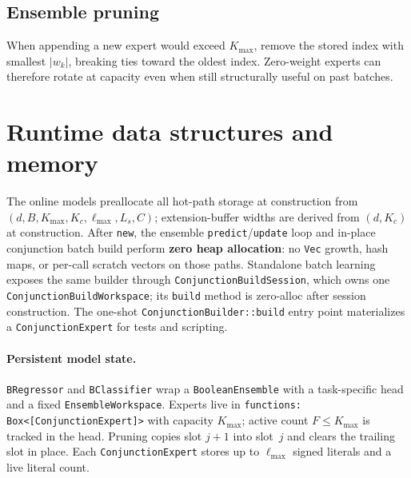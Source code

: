 \documentclass[11pt]{article}
\begin{document}
\subsection{Ensemble pruning}
When appending a new expert would exceed $K_{\max}$, remove the stored index
with smallest $|w_k|$, breaking ties toward the oldest index.  Zero-weight
experts can therefore rotate at capacity even when still structurally useful on
past batches.

\section{Runtime data structures and memory}
The online models preallocate all hot-path storage at construction from
$(d,B,K_{\max},K_c,\ell_{\max},L_s,C)$; extension-buffer widths are derived
from $(d,K_c)$ at construction.  After \texttt{new}, the ensemble
\texttt{predict}/\texttt{update} loop and in-place conjunction batch build perform
\textbf{zero heap allocation}: no \texttt{Vec} growth, hash maps, or per-call
scratch vectors on those paths.  Standalone batch learning exposes the same
builder through \texttt{ConjunctionBuildSession}, which owns one
\texttt{ConjunctionBuildWorkspace}; its \texttt{build} method is zero-alloc after session
construction.  The one-shot \texttt{ConjunctionBuilder::build} entry point materializes
a \texttt{ConjunctionExpert} for tests and scripting.

\paragraph{Persistent model state.}
\texttt{BRegressor} and \texttt{BClassifier} wrap a \texttt{BooleanEnsemble}
with a task-specific head and a fixed \texttt{EnsembleWorkspace}.  Experts
live in \texttt{functions: Box<[ConjunctionExpert]>} with capacity $K_{\max}$;
active count $F\leq K_{\max}$ is tracked in the head.  Pruning copies slot
$j{+}1$ into slot~$j$ and clears the trailing slot in place.  Each
\texttt{ConjunctionExpert} stores up to $\ell_{\max}$ signed literals and a live
literal count.
\end{document}

